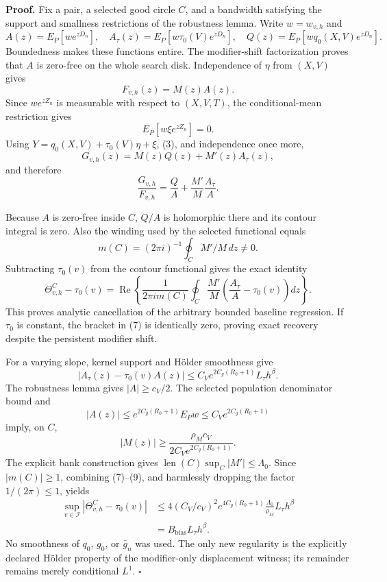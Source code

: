 \textbf{Proof.}
Fix a pair, a selected good circle \(C\), and a bandwidth satisfying the support and smallness restrictions of the robustness lemma.  Write \(w=w_{v,h}\) and
\[
 A(z)=E_P[we^{zD_n}],\quad
 A_\tau(z)=E_P[w\tau_0(V)e^{zD_n}],\quad
 Q(z)=E_P[wq_0(X,V)e^{zD_n}]. \tag{1}
\]
Boundedness makes these functions entire.  The modifier-shift factorization proves that \(A\) is zero-free on the whole search disk.  Independence of \(\eta\) from \((X,V)\) gives
\[
 F_{v,h}(z)=M(z)A(z). \tag{2}
\]
Since \(we^{zZ_n}\) is measurable with respect to \((X,V,T)\), the conditional-mean restriction gives
\[
 E_P[w\xi e^{zZ_n}]=0. \tag{3}
\]
Using \(Y=q_0(X,V)+\tau_0(V)\eta+\xi\), (3), and independence once more,
\[
 G_{v,h}(z)=M(z)Q(z)+M'(z)A_\tau(z), \tag{4}
\]
and therefore
\[
 \frac{G_{v,h}}{F_{v,h}}
 =\frac QA+\frac{M'}M\frac{A_\tau}{A}. \tag{5}
\]

Because \(A\) is zero-free inside \(C\), \(Q/A\) is holomorphic there and its contour integral is zero.  Also the winding used by the selected functional equals
\[
 m(C)=(2\pi i)^{-1}\oint_C M'/M\,dz\ne0. \tag{6}
\]
Subtracting \(\tau_0(v)\) from the contour functional gives the exact identity
\[
 \Theta^C_{v,h}-\tau_0(v)
 =\operatorname{Re}\left\{\frac1{2\pi i m(C)}
 \oint_C\frac{M'}M
 \left(\frac{A_\tau}{A}-\tau_0(v)\right)dz\right\}. \tag{7}
\]
This proves analytic cancellation of the arbitrary bounded baseline regression.  If \(\tau_0\) is constant, the bracket in (7) is identically zero, proving exact recovery despite the persistent modifier shift.

For a varying slope, kernel support and Hölder smoothness give
\[
 |A_\tau(z)-\tau_0(v)A(z)|
 \le C_Ve^{2C_g(R_0+1)}L_\tau h^\beta. \tag{8}
\]
The robustness lemma gives \(|A|\ge c_V/2\).  The selected population denominator bound and
\[
 |A(z)|\le e^{2C_g(R_0+1)}E_Pw
 \le C_Ve^{2C_g(R_0+1)}
\]
imply, on \(C\),
\[
 |M(z)|\ge
 \frac{\rho_Mc_V}{2C_Ve^{2C_g(R_0+1)}}. \tag{9}
\]
The explicit bank construction gives
\(\operatorname{len}(C)\sup_C|M'|\le\Lambda_0\).
Since \(|m(C)|\ge1\), combining (7)--(9), and harmlessly dropping the factor \(1/(2\pi)\le1\), yields
\[
\begin{aligned}
 \sup_{v\in\mathcal I}|\Theta^C_{v,h}-\tau_0(v)|
 &\le
 4(C_V/c_V)^2e^{4C_g(R_0+1)}
 \frac{\Lambda_0}{\rho_M}L_\tau h^\beta\\
 &=B_{\mathrm{bias}}L_\tau h^\beta. \tag{10}
\end{aligned}
\]
No smoothness of \(q_0\), \(g_0\), or \(\bar g_n\) was used.  The only new regularity is the explicitly declared Hölder property of the modifier-only displacement witness; its remainder remains merely conditional \(L^1\). \(\square\)